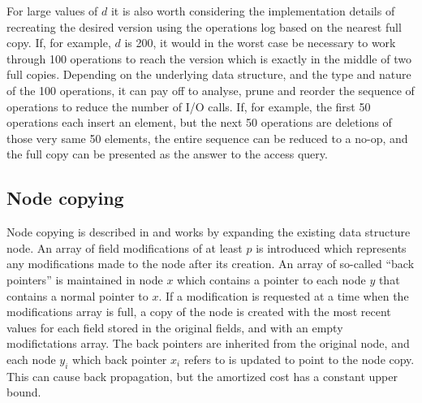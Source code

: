 For large values of $d$ it is also worth considering the implementation details
of recreating the desired version using the operations log based on the
nearest full copy. If, for example, $d$ is 200, it would in the worst case be
necessary to work through 100 operations to reach the version which is exactly
in the middle of two full copies. Depending on the underlying data structure,
and the type and nature of the 100 operations, it can pay off to analyse,
prune and reorder the sequence of operations to reduce the number of I/O calls.
If, for example, the first 50 operations each insert an element, but the next 50
operations are deletions of those very same 50 elements, the entire sequence can
be reduced to a no-op, and the full copy can be presented as the answer to the
access query.

\subsection{Node copying}
Node copying is described in \cite{Driscoll198986} and works by expanding the
existing data structure node. An array of field modifications of at least $p$ is
introduced which represents any modifications made to the node after its
creation. An array of so-called ``back pointers'' is maintained in node $x$
which contains a pointer to each node $y$ that contains a normal pointer to $x$.
If a modification is requested at a time when the modifications array is full, a
copy of the node is created with the most recent values for each field stored in
the original fields, and with an empty modifictations array. The back pointers
are inherited from the original node, and each node $y_i$ which back pointer
$x_i$ refers to is updated to point to the node copy. This can cause back
propagation, but the amortized cost has a constant upper bound.
